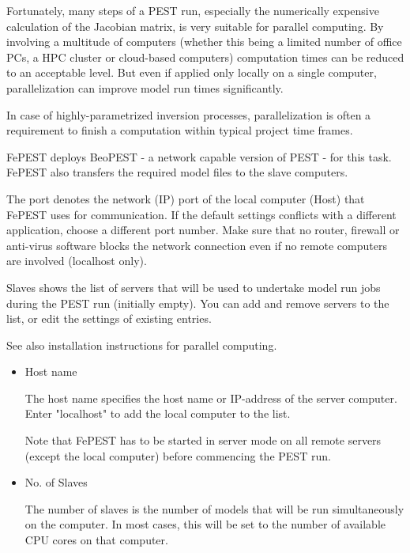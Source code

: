 Fortunately, many steps of a PEST run, especially the numerically expensive calculation of the Jacobian matrix, is very suitable for parallel computing. By involving a multitude of computers (whether this being a limited number of office PCs, a HPC cluster or cloud-based computers) computation times can be reduced to an acceptable level. But even if applied only locally on a single computer, parallelization can improve model run times significantly.

In case of highly-parametrized inversion processes, parallelization is often a requirement to finish a computation within typical project time frames.

FePEST deploys BeoPEST - a network capable version of PEST - for this task. FePEST also transfers the required model files to the slave computers. 

The port denotes the network (IP) port of the local computer (Host) that FePEST uses for communication. If the default settings conflicts with a different application, choose a different port number. Make sure that no router, firewall or anti-virus software blocks the network connection even if no remote computers are involved (localhost only).

Slaves shows the list of servers that will be used to undertake model run jobs during the PEST run (initially empty). You can add and remove servers to the list, or edit the settings of existing entries.

See also installation instructions for parallel computing.

\begin{itemize}
\item Host name

The host name specifies the host name or IP-address of the server computer. Enter "localhost" to add the local computer to the list.

Note that FePEST has to be started in server mode on all remote servers (except the local computer) before commencing the PEST run.

\item No. of Slaves

The number of slaves is the number of models that will be run simultaneously on the computer. In most cases, this will be set to the number of available CPU cores on that computer.

\end{itemize}


